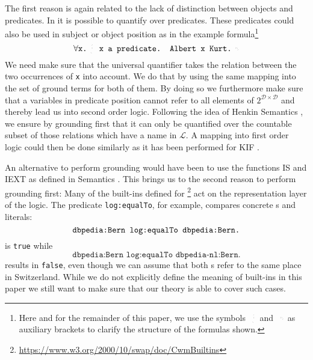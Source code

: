 The first reason is again related to the lack of distinction 
between objects and predicates. In \nthree it is possible to quantify over predicates. 
These predicates could also be used in subject or object position as in the example formula\footnote{Here and for the remainder of this paper, we use the symbols $\lhexbrace$ and $\rhexbrace$ as auxiliary brackets 
to clarify the structure of the formulas shown.}
\[
 \forall \texttt{x.}\lhexbrace\texttt{ x a predicate. Albert x Kurt.}\rhexbrace
\]
We need make sure that the universal quantifier takes the relation between the 
two occurrences of \texttt{x} into account. 
We do that by using the same mapping into the set of ground terms for both of them.
By doing so we furthermore make sure that a variables in predicate position cannot refer to all elements of $2^{\mathcal{D}\times\mathcal{D}}$ and thereby lead us into second order logic.
Following the idea of  Henkin Semantics \cite{henkin_1950}, we ensure by grounding first that it can only be quantified over 
the countable subset of those relations 
which have a name in $\mathcal{L}$. 
A mapping into first order logic could then be done similarly as it has been performed for KIF \cite{skif}. %

An alternative to perform grounding would have been to use the functions IS and IEXT as defined in \rdf Semantics \cite{RDFSemantics}. 
This brings us to the second reason to perform grounding first: %
%
Many of the built-ins defined 
for \nthreelogic\footnote{\url{https://www.w3.org/2000/10/swap/doc/CwmBuiltins}} 
act on the representation layer of the logic. The predicate \texttt{log:equalTo}, for example, 
compares concrete \uri{}s and literals:
\[
 \texttt{dbpedia:Bern log:equalTo \texttt{dbpedia:Bern}.} 
\]
is \texttt{true} while
\[
 \texttt{dbpedia:Bern log:equalTo dbpedia-nl:Bern.}
\]
results in \texttt{false}, even though we can assume that both \uri{}s refer to the same place in Switzerland.
While we do not explicitly define the meaning of built-ins in this paper 
we still want to make sure that our theory is able to cover such cases.

